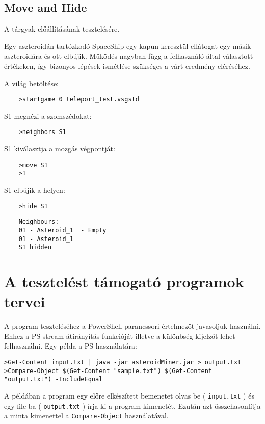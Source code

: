 \documentclass[../../projlab]{subfiles}
\begin{document}
\subsection{Move and Hide}
\begin{test-case-description}
    A tárgyak előállításának tesztelésére.
\end{test-case-description}
\begin{test-case-function}
    Egy aszteroidán tartózkodó SpaceShip egy kapun keresztül ellátogat egy másik aszteroidára és ott elbújik. \newline
    Működés nagyban függ a felhasználó által választott értékeken, így bizonyos lépések ismétlése szükséges a várt eredmény eléréséhez.
\end{test-case-function}
\begin{test-case-input}

    A világ betöltése: 
    \begin{verbatim}
    >startgame 0 teleport_test.vsgstd
    \end{verbatim}
    S1 megnézi a szomszédokat:
    \begin{verbatim}
    >neighbors S1
    \end{verbatim}
    S1 kiválasztja a mozgás végpontját:
    \begin{verbatim}
    >move S1
    >1
    \end{verbatim}
    S1 elbújik a helyen:
    \begin{verbatim}
    >hide S1
    \end{verbatim}
\end{test-case-input}
\begin{test-case-output}
\begin{verbatim}
    Neighbours:
    01 - Asteroid_1  - Empty
    01 - Asteroid_1
    S1 hidden
\end{verbatim}
\end{test-case-output}

\section{A tesztelést támogató programok tervei}
A program teszteléséhez a PowerShell parancssori értelmezőt javasoljuk használni.
Ehhez a PS stream átirányítás funkcióját illetve a különbség kijelzőt lehet felhasználni.
Egy példa a PS használatára:

\begin{adjustwidth}{-30pt}{0pt}
\begin{verbatim}
>Get-Content input.txt | java -jar asteroidMiner.jar > output.txt
>Compare-Object $(Get-Content "sample.txt") $(Get-Content "output.txt") -IncludeEqual
\end{verbatim}
\end{adjustwidth}

A példában a program egy előre elkészített bemenetet olvas be ( \verb"input.txt" )
és egy file ba ( \verb"output.txt" ) írja ki a program kimenetét.
Ezután azt összehasonlítja a minta kimenettel a \verb"Compare-Object" használatával.
\end{document}
